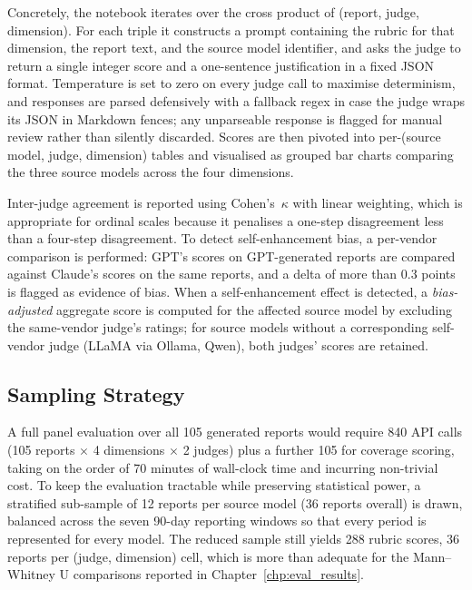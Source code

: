 \documentclass[]{UCD_CS_FYP_Report}
\begin{document}
Concretely, the notebook iterates over the cross product of (report, judge, dimension). For each triple it constructs a prompt containing the rubric for that dimension, the report text, and the source model identifier, and asks the judge to return a single integer score and a one-sentence justification in a fixed JSON format. Temperature is set to zero on every judge call to maximise determinism, and responses are parsed defensively with a fallback regex in case the judge wraps its JSON in Markdown fences; any unparseable response is flagged for manual review rather than silently discarded. Scores are then pivoted into per-(source model, judge, dimension) tables and visualised as grouped bar charts comparing the three source models across the four dimensions.

Inter-judge agreement is reported using Cohen's~$\kappa$ with linear weighting, which is appropriate for ordinal scales because it penalises a one-step disagreement less than a four-step disagreement. To detect self-enhancement bias, a per-vendor comparison is performed: GPT's scores on GPT-generated reports are compared against Claude's scores on the same reports, and a delta of more than 0.3 points is flagged as evidence of bias. When a self-enhancement effect is detected, a \textit{bias-adjusted} aggregate score is computed for the affected source model by excluding the same-vendor judge's ratings; for source models without a corresponding self-vendor judge (LLaMA via Ollama, Qwen), both judges' scores are retained.

\subsection{Sampling Strategy}
\label{sec:judge_sampling}

A full panel evaluation over all 105 generated reports would require 840 API calls (105 reports $\times$ 4 dimensions $\times$ 2 judges) plus a further 105 for coverage scoring, taking on the order of 70 minutes of wall-clock time and incurring non-trivial cost. To keep the evaluation tractable while preserving statistical power, a stratified sub-sample of 12 reports per source model (36 reports overall) is drawn, balanced across the seven 90-day reporting windows so that every period is represented for every model. The reduced sample still yields 288 rubric scores, 36 reports per (judge, dimension) cell, which is more than adequate for the Mann--Whitney U comparisons reported in Chapter~\ref{chp:eval_results}.
 
\end{document}
